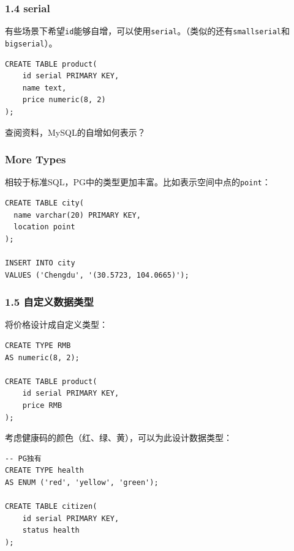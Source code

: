 \documentclass[aspectratio=169, 14pt]{beamer}
\begin{document}
\begin{frame}[fragile]
    \frametitle{1.4 serial}
有些场景下希望\texttt{id}能够自增，可以使用\texttt{serial}。（类似的还有\texttt{smallserial}和\texttt{bigserial}）。

\begin{verbatim}
CREATE TABLE product(
    id serial PRIMARY KEY,
    name text,
    price numeric(8, 2)
);
\end{verbatim}

 查阅资料，MySQL的自增如何表示？

\end{frame}

\begin{frame}[fragile]
    \frametitle{More Types}

相较于标准SQL，PG中的类型更加丰富。比如表示空间中点的\texttt{point}：

\begin{verbatim}
CREATE TABLE city(
  name varchar(20) PRIMARY KEY,
  location point
);

INSERT INTO city
VALUES ('Chengdu', '(30.5723, 104.0665)');
\end{verbatim}

\end{frame}

\begin{frame}[fragile]
    \frametitle{1.5 自定义数据类型}
将价格设计成自定义类型：

\begin{verbatim}
CREATE TYPE RMB
AS numeric(8, 2);

CREATE TABLE product(
    id serial PRIMARY KEY,
    price RMB
);
\end{verbatim}

\end{frame}

\begin{frame}[fragile]
考虑健康码的颜色（红、绿、黄），可以为此设计数据类型：

\begin{verbatim}
-- PG独有
CREATE TYPE health
AS ENUM ('red', 'yellow', 'green');

CREATE TABLE citizen(
    id serial PRIMARY KEY,
    status health
);
\end{verbatim}

\end{frame}
\end{document}
